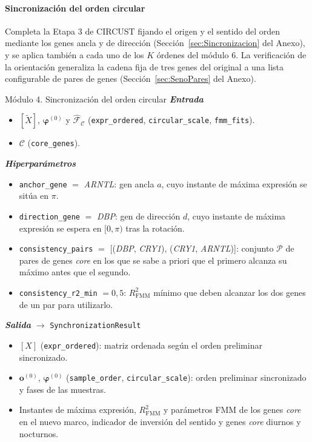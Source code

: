 \documentclass[12pt, a4paper]{report}
\newcommand{\dato}[2]{{\boldmath\textcolor{#1}{#2}}}
\begin{document}
\paragraph{Sincronización del orden circular}
Completa la Etapa 3 de CIRCUST fijando el origen y el sentido del orden mediante los genes ancla y de dirección (Sección~\ref{sec:Sincronizacion} del Anexo), y se aplica también a cada uno de los \(K\) órdenes del módulo 6. La verificación de la orientación generaliza la cadena fija de tres genes del original a una lista configurable de pares de genes (Sección~\ref{sec:SenoPares} del Anexo).

\begin{panel}{Módulo 4. Sincronización del orden circular}
\textit{\textbf{Entrada}}
\begin{itemize}[nosep,leftmargin=1.5em]
\item \dato{dP}{\([\widetilde{X}]\), \(\boldsymbol{\varphi}^{(0)}\) y \(\widehat{\mathcal{F}}_{\mathcal{C}}\) (\texttt{expr\_ordered}, \texttt{circular\_scale}, \texttt{fmm\_fits})}.
\item \dato{dC}{\(\mathcal{C}\) (\texttt{core\_genes})}.
\end{itemize}

\textit{\textbf{Hiperparámetros}}
\begin{itemize}[nosep,leftmargin=1.5em]
\item \texttt{anchor\_gene} \(=\) \textit{ARNTL}: gen ancla \(a\), cuyo instante de máxima expresión se sitúa en \(\pi\).
\item \texttt{direction\_gene} \(=\) \textit{DBP}: gen de dirección \(d\), cuyo instante de máxima expresión se espera en \([0,\pi)\) tras la rotación.
\item \texttt{consistency\_pairs} \(=\) [(\textit{DBP}, \textit{CRY1}), (\textit{CRY1}, \textit{ARNTL})]: conjunto \(\mathcal{P}\) de pares de genes \textit{core} en los que se sabe a priori que el primero alcanza su máximo antes que el segundo.
\item \texttt{consistency\_r2\_min} \(=0{,}5\): \(R^2_{\mathrm{FMM}}\) mínimo que deben alcanzar los dos genes de un par para utilizarlo.
\end{itemize}

\textit{\textbf{Salida}} \(\rightarrow\) \texttt{SynchronizationResult}
\begin{itemize}[nosep,leftmargin=1.5em]
\item \dato{dX}{\([X]\) (\texttt{expr\_ordered})}: matriz ordenada según el orden preliminar sincronizado.
\item \dato{dX}{\(\mathbf{o}^{(0)}\), \(\boldsymbol{\varphi}^{(0)}\) (\texttt{sample\_order}, \texttt{circular\_scale})}: orden preliminar sincronizado y fases de las muestras.
\item Instantes de máxima expresión, \(R^2_{\mathrm{FMM}}\) y parámetros FMM de los genes \textit{core} en el nuevo marco, indicador de inversión del sentido y genes \textit{core} diurnos y nocturnos.
\end{itemize}
\end{panel}
\end{document}
